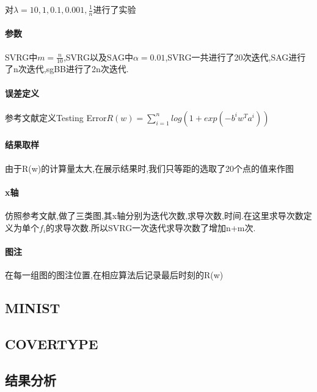 \documentclass[UTF8]{ctexart}
\begin{document}
对$\lambda=10,1,0.1,0.001,\frac{1}{n}$进行了实验
\paragraph{参数}
SVRG中$m=\frac{n}{10}$,SVRG以及SAG中$\alpha=0.01$,SVRG一共进行了20次迭代,SAG进行了n次迭代,sgBB进行了2n次迭代.
\paragraph{误差定义}
参考文献定义Testing Error$R(w)=\sum_{i=1}^{n}log(1+exp(-b^iw^Ta^i))$
\paragraph{结果取样}
由于R(w)的计算量太大,在展示结果时,我们只等距的选取了20个点的值来作图
\paragraph{x轴}
仿照参考文献,做了三类图,其x轴分别为迭代次数,求导次数,时间.在这里求导次数定义为单个$f_i$的求导次数.所以SVRG一次迭代求导次数了增加n+m次.
\paragraph{图注}
在每一组图的图注位置,在相应算法后记录最后时刻的R(w)

\subsection{MINIST}

\subsection{COVERTYPE}




\subsection{结果分析}




\end{document}
